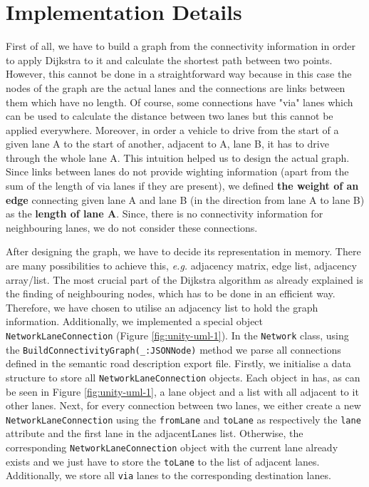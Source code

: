 \section{Implementation Details}
First of all, we have to build a graph from the connectivity information in order to apply Dijkstra to it and calculate the shortest path between two points. However, this cannot be done in a straightforward way because in this case the nodes of the graph are the actual lanes and the connections are links between them which have no length. Of course, some connections have "via" lanes which can be used to calculate the distance between two lanes but this cannot be applied everywhere. Moreover, in order a vehicle to drive from the start of a given lane A to the start of another, adjacent to A, lane B, it has to drive through the whole lane A. This intuition helped us to design the actual graph. Since links between lanes do not provide wighting information (apart from the sum of the length of via lanes if they are present), we defined \textbf{the weight of an edge} connecting given lane A and lane B (in the direction from lane A to lane B) as the \textbf{length of lane A}. Since, there is no connectivity information for neighbouring lanes, we do not consider these connections.

After designing the graph, we have to decide its representation in memory. There are many possibilities to achieve this, \emph{e.g.} adjacency matrix, edge list, adjacency array/list. The most crucial part of the Dijkstra algorithm as already explained is the finding of neighbouring nodes, which has to be done in an efficient way. Therefore, we have chosen to utilise an adjacency list to hold the graph information. Additionally, we implemented a special object \texttt{NetworkLaneConnection} (Figure \ref{fig:unity-uml-1}). In the \texttt{Network} class, using the \texttt{BuildConnectivityGraph(\_:\;JSONNode)} method we parse all connections defined in the semantic road description export file. Firstly, we initialise a data structure to store all \texttt{NetworkLaneConnection} objects. Each object in has, as can be seen in Figure \ref{fig:unity-uml-1}, a lane object and a list with all adjacent to it other lanes. Next, for every connection between two lanes, we either create a new \texttt{NetworkLaneConnection} using the \texttt{fromLane} and \texttt{toLane} as respectively the \texttt{lane} attribute and the first lane in the adjacentLanes list. Otherwise, the corresponding \texttt{NetworkLaneConnection} object with the current lane already exists and we just have to store the \texttt{toLane} to the list of adjacent lanes. Additionally, we store all \texttt{via} lanes to the corresponding destination lanes.

